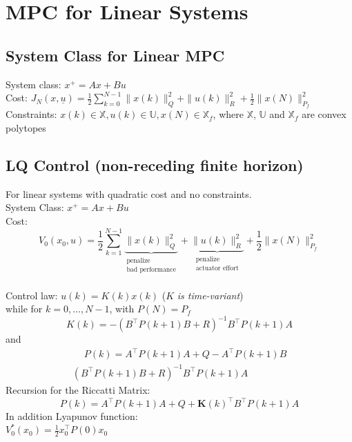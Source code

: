 \documentclass[english]{latex4ei/latex4ei_sheet}
\begin{document}
\newpage
\section{MPC for Linear Systems}
\begin{sectionbox}

\subsection{System Class for Linear MPC}
System class: $x^{+}=A x+B u$ \\
Cost: $J_{N}(x, \underline{u})=\frac{1}{2} \sum\limits_{k=0}^{N-1}\|x(k)\|_{Q}^{2}+\|u(k)\|_{R}^{2}+\frac{1}{2}\|x(N)\|_{P_{f}}^{2}$ \\
Constraints: $x(k) \in \mathbb{X}, u(k) \in \mathbb{U}, x(N) \in \mathbb{X}_{f}$, where $\mathbb{X}$, $\mathbb{U}$ and $\mathbb{X}_{f}$ are convex polytopes\\

\subsection{LQ Control (non-receding finite horizon)}
For linear systems with quadratic cost and no constraints.\\
System Class: $x^{+}=A x+B u$ \\
Cost: $$V_{0}\left(x_{0}, u\right)=\frac{1}{2} \sum_{k=1}^{N-1}\underbrace{\|x(k)\|_{Q}^{2}}_{\substack{\text{penalize} \\ \text{bad performance}}}+\underbrace{\|u(k)\|_{R}^{2}}_{\substack{\text{penalize} \\ \text{actuator effort}}}+\frac{1}{2}\|x(N)\|_{P_{f}}^{2}$$ \\
Control law: $u(k)=K(k) x(k)$ \quad ($K$ \textit{is time-variant})\vspace{0.1cm}
\\
while for $k=0, \ldots, N-1$, with $P(N)=P_{f}$
$$K(k)=-\left(B^{\top} P(k+1) B+R\right)^{-1} B^{\top} P(k+1) A$$ and
\begin{multline*}
    \quad\ P(k)=A^{\top} P(k+1) A+Q-A^{\top} P(k+1) B\\\left(B^{\top} P(k+1) B+R\right)^{-1} B^{\top} P(k+1) A
\end{multline*}
Recursion for the Riccatti Matrix:
$$P(k)=A^{\top} P(k+1) A+Q+\boldsymbol{K}(k)^{\top}B^{\top} P(k+1)A$$
In addition Lyapunov function:\\ 
$V_{0}^{*}\left(x_{0}\right)=\frac{1}{2} x_{0}^{\top} P(0) x_{0}$\\


\end{sectionbox}
\end{document}
